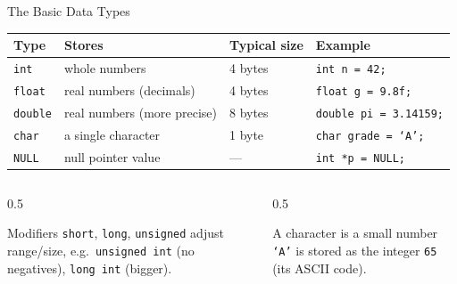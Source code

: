\documentclass[aspectratio=169]{beamer}
\begin{document}
	\begin{frame}{The Basic Data Types}
		\renewcommand{\arraystretch}{1.35}
		\centering
		\begin{tabular}{@{}llll@{}}
			\toprule
			\textbf{Type} & \textbf{Stores} & \textbf{Typical size} & \textbf{Example} \\
			\midrule
			\texttt{int}    & whole numbers            & 4 bytes & \texttt{int n = 42;} \\
			\texttt{float}  & real numbers (decimals)  & 4 bytes & \texttt{float g = 9.8f;} \\
			\texttt{double} & real numbers (more precise) & 8 bytes & \texttt{double pi = 3.14159;} \\
			\texttt{char}   & a single character       & 1 byte  & \texttt{char grade = `A';} \\
			\texttt{NULL}   & null pointer value         & ---     & \texttt{int *p = NULL;} \\
			\bottomrule
		\end{tabular}
		\vspace{0.3cm}
		\begin{columns}[T]
			\begin{column}{0.5\textwidth}
				
				\begin{block}{Modifiers}
					\small \texttt{short}, \texttt{long}, \texttt{unsigned} adjust range/size, e.g.\ \texttt{unsigned int} (no negatives), \texttt{long int} (bigger).
				\end{block}
			\end{column}
			\begin{column}{0.5\textwidth}
				\begin{block}{A character is a small number}
					\small \texttt{`A'} is stored as the integer \texttt{65} (its ASCII code).
				\end{block}
			\end{column}
		\end{columns}

	\end{frame}
	
\end{document}
